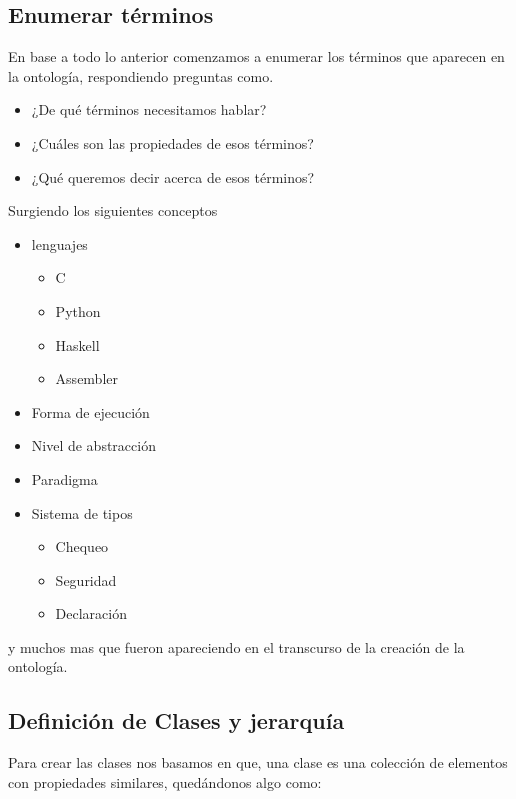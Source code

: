 \documentclass[12pt, titlepage, a4paper]{article}
\begin{document}
\subsection{Enumerar términos}
En base a todo lo anterior comenzamos a enumerar los términos que 
aparecen en la ontología, respondiendo preguntas como.
\begin{itemize}
    \item {¿De qué términos necesitamos hablar?}
    \item {¿Cuáles son las propiedades de esos términos?}
    \item {¿Qué queremos decir acerca de esos términos?}
\end{itemize}
Surgiendo los siguientes conceptos
\begin{itemize}
    \item {lenguajes
            \begin{itemize}
                \item {C}
                \item {Python}
                \item {Haskell}
                \item {Assembler}
            \end{itemize}}
    \item {Forma de ejecución}
    \item {Nivel de abstracción}
    \item {Paradigma}
    \item {Sistema de tipos
            \begin{itemize}
                \item {Chequeo}
                \item {Seguridad}
                \item {Declaración}
            \end{itemize}}
\end{itemize}
y muchos mas que fueron apareciendo en el transcurso de la creación de 
la ontología.

\subsection{Definición de Clases y jerarquía}
Para crear las clases nos basamos en que, una clase es una colección 
de elementos con propiedades similares, quedándonos algo como:


\end{document}
